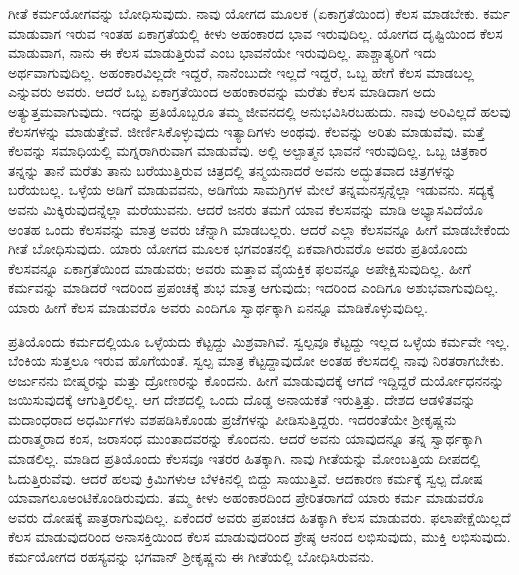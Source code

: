 ಗೀತೆ ಕರ್ಮಯೋಗವನ್ನು ಬೋಧಿಸುವುದು. ನಾವು ಯೋಗದ ಮೂಲಕ (ಏಕಾಗ್ರತೆಯಿಂದ) ಕೆಲಸ ಮಾಡಬೇಕು. ಕರ್ಮ ಮಾಡುವಾಗ ಇರುವ ಇಂತಹ ಏಕಾಗ್ರತೆಯಲ್ಲಿ ಕೀಳು ಅಹಂಕಾರದ ಭಾವ ಇರುವುದಿಲ್ಲ. ಯೋಗದ ದೃಷ್ಟಿಯಿಂದ ಕೆಲಸ ಮಾಡುವಾಗ, ನಾನು ಈ ಕೆಲಸ ಮಾಡುತ್ತಿರುವೆ ಎಂಬ ಭಾವನೆಯೇ ಇರುವುದಿಲ್ಲ. ಪಾಶ್ಚಾತ್ಯರಿಗೆ ಇದು ಅರ್ಥವಾಗುವುದಿಲ್ಲ. ಅಹಂಕಾರವಿಲ್ಲದೇ ಇದ್ದರೆ, ನಾನೆಂಬುದೇ ಇಲ್ಲದೆ ಇದ್ದರೆ, ಒಬ್ಬ ಹೇಗೆ ಕೆಲಸ ಮಾಡಬಲ್ಲ ಎನ್ನುವರು ಅವರು. ಆದರೆ ಒಬ್ಬ ಏಕಾಗ್ರತೆಯಿಂದ ಅಹಂಕಾರವನ್ನು ಮರೆತು ಕೆಲಸ ಮಾಡಿದಾಗ ಅದು ಅತ್ಯುತ್ತಮವಾಗುವುದು. ಇದನ್ನು ಪ್ರತಿಯೊಬ್ಬರೂ ತಮ್ಮ ಜೀವನದಲ್ಲಿ ಅನುಭವಿಸಿರಬಹುದು. ನಾವು ಅರಿವಿಲ್ಲದೆ ಹಲವು ಕೆಲಸಗಳನ್ನು ಮಾಡುತ್ತೇವೆ. ಜೀರ್ಣಿಸಿಕೊಳ್ಳುವುದು ಇತ್ಯಾದಿಗಳು ಅಂಥವು. ಕೆಲವನ್ನು ಅರಿತು ಮಾಡುವೆವು. ಮತ್ತೆ ಕೆಲವನ್ನು ಸಮಾಧಿಯಲ್ಲಿ ಮಗ್ನರಾಗಿರುವಾಗ ಮಾಡುವೆವು. ಅಲ್ಲಿ ಅಲ್ಪಾತ್ಮನ ಭಾವನೆ ಇರುವುದಿಲ್ಲ. ಒಬ್ಬ ಚಿತ್ರಕಾರ ತನ್ನನ್ನು ತಾನೆ ಮರೆತು ತಾನು ಬರೆಯುತ್ತಿರುವ ಚಿತ್ರದಲ್ಲಿ ತನ್ಮಯನಾದರೆ ಅವನು ಅದ್ಭುತವಾದ ಚಿತ್ರಗಳನ್ನು ಬರೆಯಬಲ್ಲ. ಒಳ್ಳೆಯ ಅಡಿಗೆ ಮಾಡುವವನು, ಅಡಿಗೆಯ ಸಾಮಗ್ರಿಗಳ ಮೇಲೆ ತನ್ನ\break ಮನಸ್ಸನ್ನೆಲ್ಲಾ ಇಡುವನು. ಸದ್ಯಕ್ಕೆ ಅವನು ಮಿಕ್ಕಿರುವುದನ್ನೆಲ್ಲಾ ಮರೆಯುವನು. ಆದರೆ ಜನರು ತಮಗೆ ಯಾವ ಕೆಲಸವನ್ನು ಮಾಡಿ ಅಭ್ಯಾಸವಿದೆಯೊ ಅಂತಹ ಒಂದು ಕೆಲಸವನ್ನು ಮಾತ್ರ ಅವರು ಚೆನ್ನಾಗಿ ಮಾಡಬಲ್ಲರು. ಆದರೆ ಎಲ್ಲಾ ಕೆಲಸವನ್ನೂ ಹೀಗೆ ಮಾಡಬೇಕೆಂದು ಗೀತೆ ಬೋಧಿಸುವುದು. ಯಾರು ಯೋಗದ ಮೂಲಕ ಭಗವಂತನಲ್ಲಿ ಏಕವಾಗಿರುವರೊ ಅವರು ಪ್ರತಿಯೊಂದು ಕೆಲಸವನ್ನೂ ಏಕಾಗ್ರತೆಯಿಂದ ಮಾಡುವರು; ಅವರು ಮತ್ತಾವ ವೈಯಕ್ತಿಕ ಫಲವನ್ನೂ ಅಪೇಕ್ಷಿಸುವುದಿಲ್ಲ. ಹೀಗೆ ಕರ್ಮವನ್ನು ಮಾಡಿದರೆ ಇದರಿಂದ ಪ್ರಪಂಚಕ್ಕೆ ಶುಭ ಮಾತ್ರ ಆಗುವುದು; ಇದರಿಂದ ಎಂದಿಗೂ ಅಶುಭವಾಗುವುದಿಲ್ಲ. ಯಾರು ಹೀಗೆ ಕೆಲಸ ಮಾಡುವರೊ ಅವರು ಎಂದಿಗೂ ಸ್ವಾರ್ಥಕ್ಕಾಗಿ ಏನನ್ನೂ ಮಾಡಿಕೊಳ್ಳುವುದಿಲ್ಲ.

ಪ್ರತಿಯೊಂದು ಕರ್ಮದಲ್ಲಿಯೂ ಒಳ್ಳೆಯದು ಕೆಟ್ಟದ್ದು ಮಿಶ್ರವಾಗಿವೆ. ಸ್ವಲ್ಪವೂ ಕೆಟ್ಟದ್ದು ಇಲ್ಲದ ಒಳ್ಳೆಯ ಕರ್ಮವೇ ಇಲ್ಲ. ಬೆಂಕಿಯ ಸುತ್ತಲೂ ಇರುವ ಹೊಗೆಯಂತೆ. ಸ್ವಲ್ಪ ಮಾತ್ರ ಕೆಟ್ಟದ್ದಾವುದೋ ಅಂತಹ ಕೆಲಸದಲ್ಲಿ ನಾವು ನಿರತರಾಗಬೇಕು. ಅರ್ಜುನನು ಬೀಷ್ಮರನ್ನು ಮತ್ತು ದ್ರೋಣರನ್ನು ಕೊಂದನು. ಹೀಗೆ ಮಾಡುವುದಕ್ಕೆ ಆಗದೆ ಇದ್ದಿದ್ದರೆ ದುರ್ಯೋಧನನನ್ನು ಜಯಿಸುವುದಕ್ಕೆ ಆಗುತ್ತಿರಲಿಲ್ಲ. ಆಗ ದೇಶದಲ್ಲಿ ಒಂದು ದೊಡ್ಡ ಅನಾಯಕತೆ ಇರುತ್ತಿತ್ತು. ದೇಶದ ಆಡಳಿತವನ್ನು ಮದಾಂಧರಾದ ಅಧರ್ಮಿಗಳು ವಶಪಡಿಸಿಕೊಂಡು ಪ್ರಜೆಗಳನ್ನು ಪೀಡಿಸುತ್ತಿದ್ದರು. ಇದರಂತೆಯೇ ಶ‍್ರೀಕೃಷ್ಣನು ದುರಾತ್ಮರಾದ ಕಂಸ, ಜರಾಸಂಧ ಮುಂತಾದವರನ್ನು ಕೊಂದನು. ಆದರೆ ಅವನು ಯಾವುದನ್ನೂ ತನ್ನ ಸ್ವಾರ್ಥಕ್ಕಾಗಿ ಮಾಡಲಿಲ್ಲ. ಮಾಡಿದ ಪ್ರತಿಯೊಂದು ಕೆಲಸವೂ ಇತರರ ಹಿತಕ್ಕಾಗಿ. ನಾವು ಗೀತೆಯನ್ನು ಮೋಂಬತ್ತಿಯ ದೀಪದಲ್ಲಿ ಓದುತ್ತಿರುವೆವು. ಆದರೆ ಹಲವು ಕ್ರಿಮಿಗಳು\break ಆ ಬೆಳಕಿನಲ್ಲಿ ಬಿದ್ದು ಸಾಯುತ್ತಿವೆ. ಆದಕಾರಣ ಕರ್ಮಕ್ಕೆ ಸ್ವಲ್ಪ ದೋಷ ಯಾವಾಗಲೂ\break ಅಂಟಿಕೊಂಡಿರುವುದು. ತಮ್ಮ ಕೀಳು ಅಹಂಕಾರದಿಂದ ಪ್ರೇರಿತರಾಗದೆ ಯಾರು ಕರ್ಮ ಮಾಡುವರೊ ಅವರು ದೋಷಕ್ಕೆ ಪಾತ್ರರಾಗುವುದಿಲ್ಲ. ಏಕೆಂದರೆ ಅವರು ಪ್ರಪಂಚದ ಹಿತಕ್ಕಾಗಿ ಕೆಲಸ ಮಾಡುವರು. ಫಲಾಪೇಕ್ಷೆಯಿಲ್ಲದೆ ಕೆಲಸ ಮಾಡುವುದರಿಂದ ಅನಾಸಕ್ತಿಯಿಂದ ಕೆಲಸ ಮಾಡುವುದರಿಂದ ಶ್ರೇಷ್ಠ ಆನಂದ ಲಭಿಸುವುದು, ಮುಕ್ತಿ ಲಭಿಸುವುದು. ಕರ್ಮಯೋಗದ ರಹಸ್ಯವನ್ನು ಭಗವಾನ್​ ಶ‍್ರೀಕೃಷ್ಣನು ಈ ಗೀತೆಯಲ್ಲಿ ಬೋಧಿಸಿರುವನು.

\vskip -0.5cm

